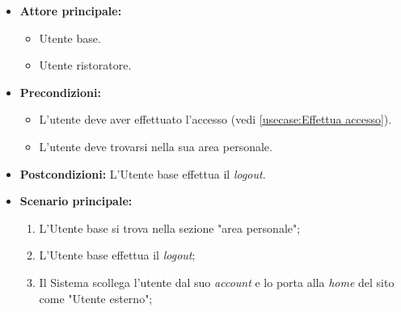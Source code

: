 \label{usecase:Logout}
\begin{itemize}
	\item \textbf{Attore principale:}
	\begin{itemize}
		\item Utente base.
		\item Utente ristoratore. 
	\end{itemize}

	\item \textbf{Precondizioni:}
	\begin{itemize}
        \item L'utente deve aver effettuato l'accesso (vedi \autoref{usecase:Effettua accesso}).
        \item L'utente deve trovarsi nella sua area personale.
    \end{itemize}

	\item \textbf{Postcondizioni:} L'Utente base effettua il \textit{logout}.

	\item \textbf{Scenario principale:}
	      \begin{enumerate}
		      \item L'Utente base si trova nella sezione "area personale";
		      \item L'Utente base effettua il \textit{logout};
              \item Il Sistema scollega l'utente dal suo \textit{account} e lo porta alla \textit{home} del sito come "Utente esterno";
	      \end{enumerate}
\end{itemize}
